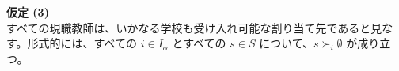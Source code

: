 \documentclass[12pt, a4paper]{article}
\theoremstyle{definition}
\theoremstyle{remark}
\theoremstyle{plain}
\begin{document}
\vspace{0.5\baselineskip}
\noindent\textbf{仮定 (3)} \\
すべての現職教師は、いかなる学校も受け入れ可能な割り当て先であると見なす。形式的には、すべての $i \in I_\alpha$ とすべての $s \in S$ について、$s \succ_i \emptyset$ が成り立つ。















\end{document}
